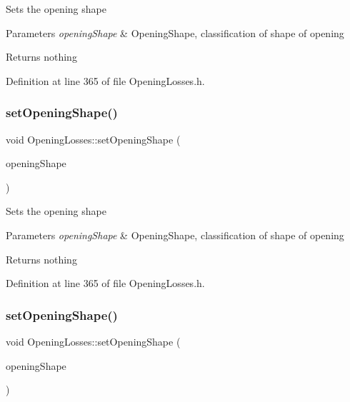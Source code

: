 Sets the opening shape


\begin{DoxyParams}{Parameters}
{\em opening\+Shape} & Opening\+Shape, classification of shape of opening\\
\hline
\end{DoxyParams}
\begin{DoxyReturn}{Returns}
nothing 
\end{DoxyReturn}


Definition at line 365 of file Opening\+Losses.\+h.

\mbox{\label{class_opening_losses_a163778704e5bdd1809d05118504da027}} 
\subsubsection{\texorpdfstring{set\+Opening\+Shape()}{setOpeningShape()}\hspace{0.1cm}{\footnotesize\ttfamily [2/3]}}
{\footnotesize\ttfamily void Opening\+Losses\+::set\+Opening\+Shape (\begin{DoxyParamCaption}\item[{\hyperlink{class_opening_losses_a57f9759b6fd72a1b75aa885800e26157}{Opening\+Shape}}]{opening\+Shape }\end{DoxyParamCaption})\hspace{0.3cm}{\ttfamily [inline]}}

Sets the opening shape


\begin{DoxyParams}{Parameters}
{\em opening\+Shape} & Opening\+Shape, classification of shape of opening\\
\hline
\end{DoxyParams}
\begin{DoxyReturn}{Returns}
nothing 
\end{DoxyReturn}


Definition at line 365 of file Opening\+Losses.\+h.

\mbox{\label{class_opening_losses_a163778704e5bdd1809d05118504da027}} 
\subsubsection{\texorpdfstring{set\+Opening\+Shape()}{setOpeningShape()}\hspace{0.1cm}{\footnotesize\ttfamily [3/3]}}
{\footnotesize\ttfamily void Opening\+Losses\+::set\+Opening\+Shape (\begin{DoxyParamCaption}\item[{\hyperlink{class_opening_losses_a57f9759b6fd72a1b75aa885800e26157}{Opening\+Shape}}]{opening\+Shape }\end{DoxyParamCaption})\hspace{0.3cm}{\ttfamily [inline]}}

